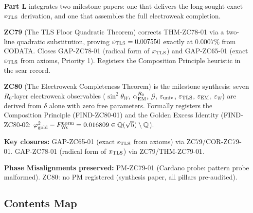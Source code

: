 \documentclass[12pt, a4paper]{article}
\begin{document}
\begin{volumebox}[title={Part L --- ZC79--80: TLS Floor Quadratic
  and Electroweak Completeness (v17.13)}]
\sloppy
\textbf{Part L} integrates two milestone papers: one that
delivers the long-sought exact $\varepsilon_{\rm TLS}$ derivation,
and one that assembles the full electroweak completion.

\textbf{ZC79} (The TLS Floor Quadratic Theorem) corrects
THM-ZC78-01 via a two-line quadratic substitution, proving
$\varepsilon_{\rm TLS} = 0.007550$ exactly at $0.0007\%$ from
CODATA. Closes GAP-ZC78-01 (radical form of $x_{\rm TLS}$) and
GAP-ZC65-01 (exact $\varepsilon_{\rm TLS}$ from axioms, Priority 1).
Registers the Composition Principle heuristic in the scar record.

\textbf{ZC80} (The Electroweak Completeness Theorem) is the
milestone synthesis: seven $R_0$-layer electroweak observables
($\sin^2\theta_W$, $\alpha_{\rm EM}^{R_0}$, $\mathcal{G}$,
$\varepsilon_{\rm univ}$, $\varepsilon_{\rm TLS}$,
$\varepsilon_{\rm EM}$, $\varepsilon_W$) are derived from
$\delta$ alone with zero free parameters. Formally registers
the Composition Principle (FIND-ZC80-01) and the Golden Excess
Identity (FIND-ZC80-02: $\varphi_{\rm gold}^2 -
F_{\rm Wc}^{\rm norm} = 0.016809 \in
\mathbb{Q}(\sqrt{5})\setminus\mathbb{Q}$).

\textbf{Key closures:}
GAP-ZC65-01 (exact $\varepsilon_{\rm TLS}$ from axioms) via
ZC79/COR-ZC79-01.
GAP-ZC78-01 (radical form of $x_{\rm TLS}$) via ZC79/THM-ZC79-01.

\textbf{Phase Misalignments preserved:}
PM-ZC79-01 (Cardano probe: pattern probe malformed).
ZC80: no PM registered (synthesis paper, all pillars pre-audited).
\end{volumebox}

\subsection*{Contents Map}
\end{document}
